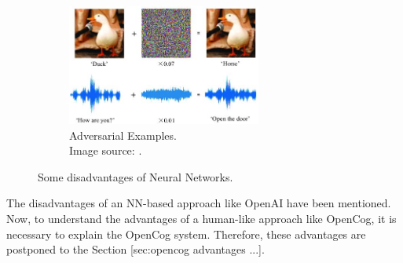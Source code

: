 \begin{figure}
\begin{subfigure}{\linewidth}
	\centering
	\includegraphics[width=0.7\textwidth]{figures/Magistrale/05 - adversarial-examples}
	\caption{Adversarial Examples. \\Image source: \cite{img05}.
	\label{fig:adversarial_examples}}
	\end{subfigure}
\caption{Some disadvantages of Neural Networks.}
\label{fig:disadvantages_nn}
\end{figure} 


The disadvantages of an NN-based approach like OpenAI have been mentioned. Now, to understand the advantages of a human-like approach like OpenCog, it is necessary to explain the OpenCog system. Therefore, these advantages are postponed to the Section [sec:opencog advantages ...]. \\

